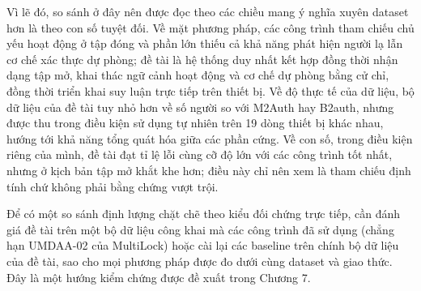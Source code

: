 \documentclass[../DoAn.tex]{subfiles}
\begin{document}
Vì lẽ đó, so sánh ở đây nên được đọc theo các chiều mang ý nghĩa xuyên dataset hơn là theo con số tuyệt đối. Về mặt phương pháp, các công trình tham chiếu chủ yếu hoạt động ở tập đóng và phần lớn thiếu cả khả năng phát hiện người lạ lẫn cơ chế xác thực dự phòng; đề tài là hệ thống duy nhất kết hợp đồng thời nhận dạng tập mở, khai thác ngữ cảnh hoạt động và cơ chế dự phòng bằng cử chỉ, đồng thời triển khai suy luận trực tiếp trên thiết bị. Về độ thực tế của dữ liệu, bộ dữ liệu của đề tài tuy nhỏ hơn về số người so với M2Auth hay B2auth, nhưng được thu trong điều kiện sử dụng tự nhiên trên 19 dòng thiết bị khác nhau, hướng tới khả năng tổng quát hóa giữa các phần cứng. Về con số, trong điều kiện riêng của mình, đề tài đạt tỉ lệ lỗi cùng cỡ độ lớn với các công trình tốt nhất, nhưng ở kịch bản tập mở khắt khe hơn; điều này chỉ nên xem là tham chiếu định tính chứ không phải bằng chứng vượt trội.

Để có một so sánh định lượng chặt chẽ theo kiểu đối chứng trực tiếp, cần đánh giá đề tài trên một bộ dữ liệu công khai mà các công trình đã sử dụng (chẳng hạn UMDAA-02 của MultiLock) hoặc cài lại các baseline trên chính bộ dữ liệu của đề tài, sao cho mọi phương pháp được đo dưới cùng dataset và giao thức. Đây là một hướng kiểm chứng được đề xuất trong Chương 7.
\end{document}
